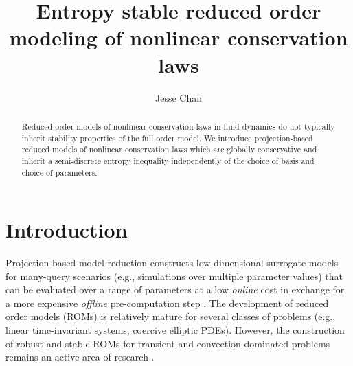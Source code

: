 \documentclass[preprint,10pt]{elsarticle}
\theoremstyle{definition}
\theoremstyle{lemma}
\theoremstyle{theorem}
\theoremstyle{assumption}
\begin{document}
\begin{frontmatter}
\title{Entropy stable reduced order modeling of nonlinear conservation laws}

\author[rice]{Jesse Chan}
\address[rice]{Department of Computational and Applied Mathematics, Rice University, 6100 Main St, Houston, TX, 77005}

\begin{abstract}
Reduced order models of nonlinear conservation laws in fluid dynamics do not typically inherit stability properties of the full order model. We introduce projection-based reduced models of nonlinear conservation laws which are globally conservative and inherit a semi-discrete entropy inequality independently of the choice of basis and choice of parameters.  
\end{abstract}
\end{frontmatter}



\section{Introduction}

Projection-based model reduction constructs low-dimensional surrogate models for many-query scenarios (e.g., simulations over multiple parameter values) that can be evaluated over a range of parameters at a low \textit{online} cost in exchange for a more expensive \textit{offline} pre-computation step \cite{benner2015survey}.  The development of reduced order models (ROMs) is relatively mature for several classes of problems (e.g., linear time-invariant systems, coercive elliptic PDEs).  However, the construction of robust and stable ROMs for transient and convection-dominated problems remains an active area of research \cite{cagniart2019model}.  
\end{document}
